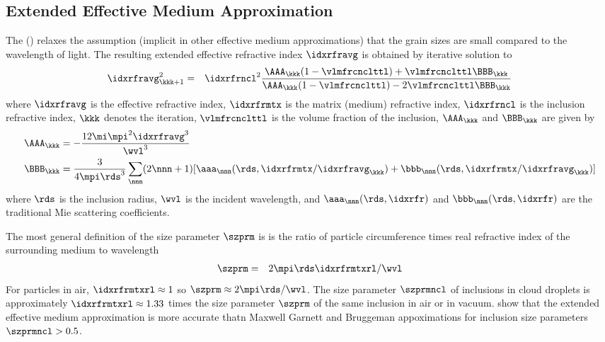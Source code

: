 \documentclass[12pt,twoside]{book}
\begin{document}
\subsection[Extended Effective Medium Aproximation]{Extended Effective Medium Approximation}\label{sxn:xem_apx}
The  () 
\cite[]{ViC98} relaxes the assumption (implicit in other effective
medium approximations) that the grain sizes are small compared to the 
wavelength of light.
The resulting extended effective refractive index $\idxrfravg$ is
obtained by iterative solution to
\begin{eqnarray}
\idxrfravg^{2}_{\kkk+1} & = & \idxrfrncl^{2}
\frac{\AAA_{\kkk}(1-\vlmfrcnclttl)+\vlmfrcnclttl\BBB_{\kkk}}{\AAA_{\kkk}(1-\vlmfrcnclttl)-2\vlmfrcnclttl\BBB_{\kkk}}
\label{eqn:xem_dfn}
\end{eqnarray}
where 
$\idxrfravg$ is the effective refractive index,
$\idxrfrmtx$ is the matrix (medium) refractive index,
$\idxrfrncl$ is the inclusion refractive index,
$\kkk$ denotes the iteration,
$\vlmfrcnclttl$ is the volume fraction of the inclusion,
$\AAA_{\kkk}$ and $\BBB_{\kkk}$ are given by 
\begin{subequations}
\label{eqn:xem_cff_dfn}
\begin{align}
\label{eqn:xem_A_dfn}
\AAA_{\kkk} & = -\frac{12\mi\mpi^{2}\idxrfravg^{3}}{\wvl^{3}} \\
\label{eqn:xem_B_dfn}
\BBB_{\kkk} & = \frac{3}{4\mpi\rds^{3}} 
\sum_{\nnn}(2\nnn+1)[\aaa_{\nnn}(\rds,\idxrfrmtx/\idxrfravg_{\kkk})+
\bbb_{\nnn}(\rds,\idxrfrmtx/\idxrfravg_{\kkk})]
\end{align}
\end{subequations}
where
$\rds$ is the inclusion radius,
$\wvl$ is the incident wavelength,
and $\aaa_{\nnn}(\rds,\idxrfr)$ and $\bbb_{\nnn}(\rds,\idxrfr)$ are
the traditional Mie scattering coefficients.

The most general definition of the size parameter $\szprm$ is
is the ratio of particle circumference times real refractive index 
of the surrounding medium to wavelength 
\begin{eqnarray}
\szprm & = & 2 \mpi \rds \idxrfrmtxrl / \wvl
\label{eqn:sz_prm_gnr_dfn}
\end{eqnarray}
For particles in air, $\idxrfrmtxrl \approx 1$ so 
$\szprm \approx 2\mpi\rds/\wvl$.
The size parameter $\szprmncl$ of inclusions in cloud droplets
is approximately $\idxrfrmtxrl \approx 1.33$ times the size parameter
$\szprm$ of the same inclusion in air or in vacuum.
\cite{ViC98} show that the extended effective medium approximation
is more accurate thatn Maxwell Garnett and Bruggeman appoximations for
inclusion size parameters $\szprmncl > 0.5$. 
\end{document}

